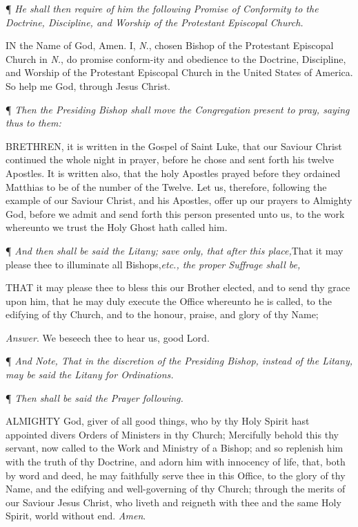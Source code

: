 ¶ \emph{He shall then
require of him the following Promise of Conformity to the Doctrine, Discipline,
and Worship of the Protestant Episcopal Church.}

IN the Name of God, Amen.
I, \emph{N}., chosen Bishop of the Protestant Episcopal Church in \emph{N.},
do promise conform-ity and obedience to the Doctrine, Discipline, and
Worship of the Protestant Episcopal Church in the United States of America.
So help me God, through Jesus Christ.

¶ \emph{Then the Presiding
Bishop shall move the Congregation present to pray, saying thus to them:}

BRETHREN, it is written
in the Gospel of Saint Luke, that our Saviour Christ continued the whole
night in prayer, before he chose and sent forth his twelve Apostles. It
is written also, that the holy Apostles prayed before they ordained Matthias
to be of the number of the Twelve. Let us, therefore, following the example
of our Saviour Christ, and his Apostles, offer up our prayers to Almighty
God, before we admit and send forth this person presented unto us, to
the work whereunto we trust the Holy Ghost hath called him.

¶
\emph{And then shall be said the Litany; save only, that after this place,}That it may please thee to illuminate all Bishops,\emph{etc., the
proper Suffrage shall be,}

THAT
it may please thee to bless this our Brother elected, and to send thy
grace upon him, that he may duly execute the Office whereunto he is
called, to the edifying of thy Church, and to the honour, praise, and
glory of thy Name;

\emph{Answer}. We beseech thee to hear us, good
Lord.

¶
\emph{And Note, That in the discretion of the Presiding Bishop, instead
of the Litany, may be said the Litany for Ordinations.}

¶ \emph{Then shall be said the Prayer following.}

ALMIGHTY
God, giver of all good things, who by thy Holy Spirit hast appointed divers
Orders of Ministers in thy Church; Mercifully behold this thy servant,
now called to the Work and Ministry of a Bishop; and so replenish him
with the truth of thy Doctrine, and adorn him with innocency of life,
that, both by word and deed, he may faithfully serve thee in this Office,
to the glory of thy Name, and the edifying and well-governing of thy Church;
through the merits of our Saviour Jesus Christ, who liveth and reigneth
with thee and the same Holy Spirit, world without end. \emph{Amen}.

